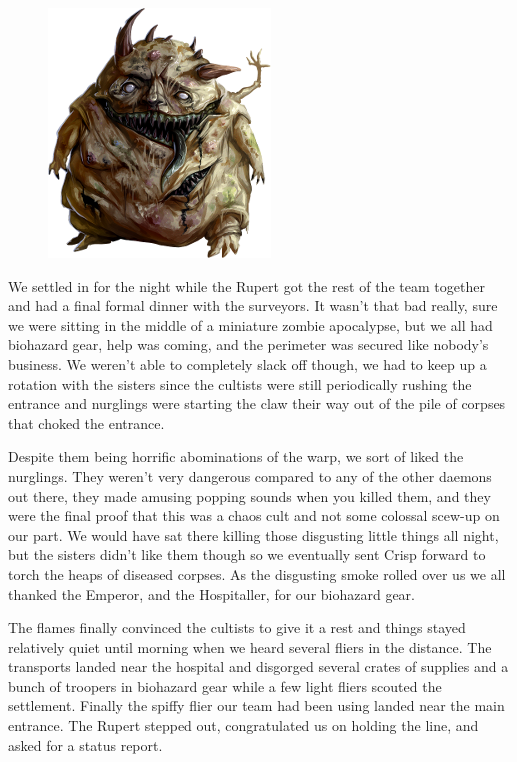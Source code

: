 \begin{figure}
	\begin{center}
		\includegraphics[width=\figwidth]{pics/6/25.png}
	\end{center}
\end{figure}
We settled in for the night while the Rupert got the rest of the team together and had a final formal dinner with the surveyors. 
It wasn't that bad really, sure we were sitting in the middle of a miniature zombie apocalypse, but we all had biohazard gear, help was coming, and the perimeter was secured like nobody's business. 
We weren't able to completely slack off though, we had to keep up a rotation with the sisters since the cultists were still periodically rushing the entrance and nurglings were starting the claw their way out of the pile of corpses that choked the entrance.

Despite them being horrific abominations of the warp, we sort of liked the nurglings. 
They weren't very dangerous compared to any of the other daemons out there, they made amusing popping sounds when you killed them, and they were the final proof that this was a chaos cult and not some colossal scew-up on our part. 
We would have sat there killing those disgusting little things all night, but the sisters didn't like them though so we eventually sent Crisp forward to torch the heaps of diseased corpses. 
As the disgusting smoke rolled over us we all thanked the Emperor, and the Hospitaller, for our biohazard gear.

The flames finally convinced the cultists to give it a rest and things stayed relatively quiet until morning when we heard several fliers in the distance. 
The transports landed near the hospital and disgorged several crates of supplies and a bunch of troopers in biohazard gear while a few light fliers scouted the settlement. 
Finally the spiffy flier our team had been using landed near the main entrance. 
The Rupert stepped out, congratulated us on holding the line, and asked for a status report.

